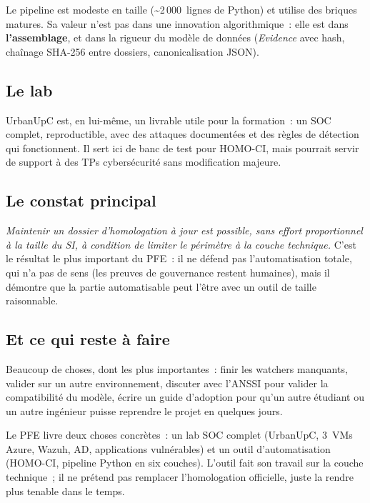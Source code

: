 Le pipeline est modeste en taille (\textasciitilde{}2\,000~lignes
de Python) et utilise des briques matures. Sa valeur n'est pas
dans une innovation algorithmique~: elle est dans
\textbf{l'assemblage}, et dans la rigueur du modèle de données
(\emph{Evidence} avec hash, chaînage SHA-256 entre dossiers,
canonicalisation JSON).

\subsection{Le lab}

UrbanUpC est, en lui-même, un livrable utile pour la formation~:
un SOC complet, reproductible, avec des attaques documentées et
des règles de détection qui fonctionnent. Il sert ici de banc de
test pour HOMO-CI, mais pourrait servir de support à des TPs
cybersécurité sans modification majeure.

\subsection{Le constat principal}

\emph{Maintenir un dossier d'homologation à jour est possible,
sans effort proportionnel à la taille du SI, à condition de
limiter le périmètre à la couche technique.} C'est le résultat
le plus important du PFE~: il ne défend pas l'automatisation
totale, qui n'a pas de sens (les preuves de gouvernance restent
humaines), mais il démontre que la partie automatisable peut
l'être avec un outil de taille raisonnable.

\subsection{Et ce qui reste à faire}

Beaucoup de choses, dont les plus importantes~: finir les
watchers manquants, valider sur un autre environnement,
discuter avec l'ANSSI pour valider la compatibilité du modèle,
écrire un guide d'adoption pour qu'un autre étudiant ou un autre
ingénieur puisse reprendre le projet en quelques jours.

\begin{takeaway}
Le PFE livre deux choses concrètes~: un lab SOC complet
(UrbanUpC, 3~VMs Azure, Wazuh, AD, applications vulnérables) et
un outil d'automatisation (HOMO-CI, pipeline Python en six
couches). L'outil fait son travail sur la couche technique~; il
ne prétend pas remplacer l'homologation officielle, juste la
rendre plus tenable dans le temps.
\end{takeaway}
